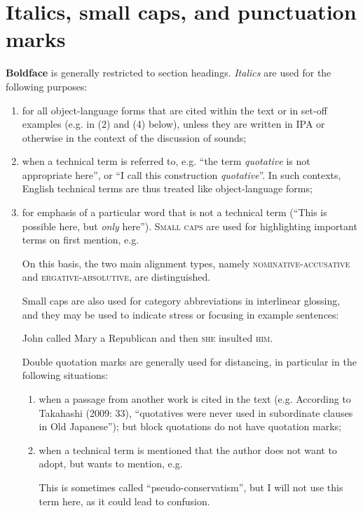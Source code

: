 \section{Italics, small caps, and punctuation marks}

\textbf{Boldface} is generally restricted to section headings.
\textit{Italics} are used for the following purposes:
\begin{enumerate}
\item for all object-language forms that are cited within the text or in set-off examples (e.g. in (2) and (4) below), unless they are written in IPA or otherwise in the context of the discussion of sounds;
\item  when a technical term is referred to, e.g. ``the term \textit{quotative} is not appropriate here'', or ``I call this construction \textit{quotative}''. In such contexts, English technical terms are thus treated like object-language forms;
\item for emphasis of a particular word that is not a technical term (``This is possible here, but \textit{only} here'').
\textsc{Small caps} are used for highlighting important terms on first mention, e.g.

\ea
On this basis, the two main alignment types, namely \textsc{nominative-accusative} and \textsc{ergative-absolutive}, are distinguished.
\z

Small caps are also used for category abbreviations in interlinear glossing, and they may be used to indicate stress or focusing in example sentences:

\ea 
John called Mary a Republican and then \textsc{she} insulted \textsc{him}.
\z



Double quotation marks are generally used for distancing, in particular in the following situations:
\begin{enumerate}
 \item  when a passage from another work is cited in the text (e.g. According to Takahashi (2009: 33), ``quotatives were never used in subordinate clauses in Old Japanese''); but block quotations do not have quotation marks;
\item when a technical term is mentioned that the author does not want to adopt, but wants to mention, e.g.

\ea
This is sometimes called ``pseudo-conservatism'', but I will not use this term here, as it could lead
to confusion.
\z



\end{enumerate}
\end{enumerate}
